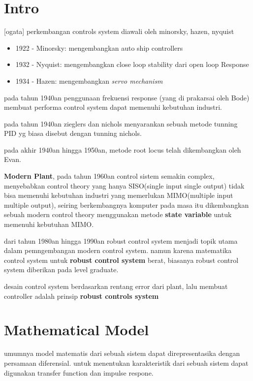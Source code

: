 \graphicspath{{./img/}}



\section{Intro}
[ogata] perkembangan controls system diawali oleh minorsky, hazen, nyquist

\begin{itemize}
  \item 1922 - Minorsky: mengembangkan auto ship controllers
  \item 1932 - Nyquist: mengembangkan close loop stability dari open loop Response
  \item 1934 - Hazen: mengembangkan \textit{servo mechanism}
\end{itemize}

pada tahun 1940an penggunaan frekuensi response (yang di prakarsai oleh Bode) membuat performa control system
dapat memenuhi kebutuhan industri.

pada tahun 1940an zieglers dan nichols menyarankan sebuah metode tunning PID yg biasa disebut dengan tunning 
nichols.

pada akhir 1940an hingga 1950an, metode root locus telah dikembangkan oleh Evan.

\textbf{Modern Plant}, pada tahun 1960an control sistem semakin complex, menyebabkan control theory 
yang hanya SISO(single input single output) tidak bisa memenuhi kebutuhan industri yang memerlukan 
MIMO(multiple input multiple output), seiring berkembangnya komputer pada masa itu dikembangkan sebuah modern control 
theory menggunakan metode \textbf{state variable} untuk memenuhi kebutuhan MIMO.

dari tahun 1980an hingga 1990an robust control system menjadi topik utama dalam pemngembangan modern control system. 
namun karena matematika control system untuk \textbf{robust control system} berat, biasanya robust control 
system diberikan pada level graduate.

desain control system berdasarkan rentang error dari plant, lalu membuat controller adalah prinsip 
\textbf{robust controls system}


\section{Mathematical Model}
umumnya model matematis dari sebuah sistem dapat direpresentasika dengan persamaan diferensial. 
untuk menentukan karakteristik dari sebuah sistem dapat digunakan transfer function dan impulse respone.

